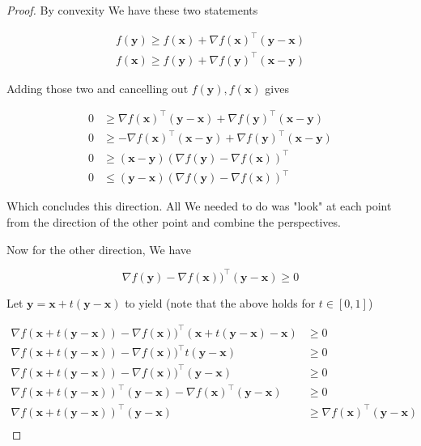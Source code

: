 \documentclass{article}
\begin{document}
		\begin{proof}
			By convexity We have these two statements
			
			\begin{align*}
				f(\mathbf{y}) \ge f(\mathbf{x}) + \nabla f(\mathbf{x})^\top (\mathbf{y-x})\\
				f(\mathbf{x}) \ge f(\mathbf{y}) + \nabla f(\mathbf{y})^\top (\mathbf{x-y})
			\end{align*}
			
			Adding those two and cancelling out $f(\mathbf{y}), f(\mathbf{x})$ gives
			
			\begin{align*}
				 0 &\ge \nabla f(\mathbf{x})^\top (\mathbf{y-x}) + \nabla f(\mathbf{y})^\top (\mathbf{x-y})\\
				 0 &\ge -\nabla f(\mathbf{x})^\top (\mathbf{x-y}) + \nabla f(\mathbf{y})^\top (\mathbf{x-y})\\
				 0 &\ge (\mathbf{x-y})( \nabla f(\mathbf{y}) -\nabla f(\mathbf{x}))^\top\\
				 0 &\le (\mathbf{y-x})( \nabla f(\mathbf{y}) -\nabla f(\mathbf{x}))^\top
			\end{align*}
			
			Which concludes this direction. All We needed to do was "look" at each point from the direction of the other point and combine the perspectives.
			
			Now for the other direction, We have
			
			\[ \nabla f(\mathbf{y}) - \nabla f(\mathbf{x}))^\top (\mathbf{y-x}) \ge 0 \]
			
			Let $\mathbf{y} = \mathbf{x} + t(\mathbf{y-x})$ to yield (note that the above holds for $t\in [0, 1]$)
			
			\begin{align*}
				\nabla f(\mathbf{x} + t(\mathbf{y-x})) - \nabla f(\mathbf{x}))^\top (\mathbf{x} + t(\mathbf{y-x}) - \mathbf{x}) &\ge 0 \\
				\nabla f(\mathbf{x} + t(\mathbf{y-x})) - \nabla f(\mathbf{x}))^\top t(\mathbf{y-x}) &\ge 0 \\
				\nabla f(\mathbf{x} + t(\mathbf{y-x})) - \nabla f(\mathbf{x}))^\top (\mathbf{y-x}) &\ge 0 \\
				\nabla f(\mathbf{x} + t(\mathbf{y-x}))^\top(\mathbf{y-x}) - \nabla f(\mathbf{x})^\top (\mathbf{y-x}) &\ge 0 \\
				\nabla f(\mathbf{x} + t(\mathbf{y-x}))^\top (\mathbf{y-x})  &\ge  \nabla f(\mathbf{x})^\top (\mathbf{y-x}) \\
			\end{align*}
			

\end{proof}
\end{document}
